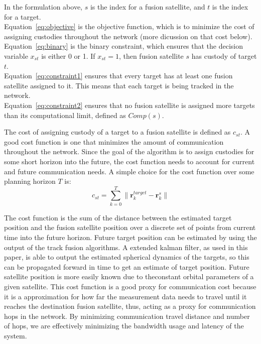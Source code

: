     In the formulation above, $s$ is the index for a fusion satellite, and $t$ is the index for a target. \\
    Equation~\eqref{eq:objective} is the objective function, which is to minimize the cost of assigning custodies throughout the network (more dicussion on that cost below). \\
    Equation~\eqref{eq:binary} is the binary constraint, which ensures that the decision variable $x_{st}$ is either 0 or 1. If $x_{st} = 1$, then fusion satellite $s$ has custody of target $t$. \\
    Equation~\eqref{eq:constraint1} ensures that every target has at least one fusion satellite assigned to it. This means that each target is being tracked in the network. \\
    Equation~\eqref{eq:constraint2} ensures that no fusion satellite is assigned more targets than its computational limit, defined as $Comp(s)$. 

    The cost of assigning custody of a target to a fusion satellite is defined as $c_{st}$. A good cost function is one that minimizes the amount of communication throughout the network. 
    Since the goal of the algorithm is to assign custodies for some short horizon into the future, the cost function needs to account for current and future communication needs. 
    A simple choice for the cost function over some planning horizon $T$ is:
    \begin{equation}
        c_{st} = \sum_{k=0}^{T} \| \mathbf{r}_k^{target} - \mathbf{r}_k^s \|
        \label{eq:cost}
    \end{equation}

    The cost function is the sum of the distance between the estimated target position and the fusion satellite position over a discrete set of points from current time into the future horizon. 
    Future target position can be estimated by using the output of the track fusion algorithms. A extended kalman filter, as used in this paper, is able to output the estimated spherical dynamics of the targets, so this can be propagated forward in time to get an estimate of target position.
    Future satellite position is more easily known due to theconstant orbital parameters of a given satellite.
    This cost function is a good proxy for communication cost because it is a approximation for how far the measurement data needs to travel until it reaches the destination fusion satellite, thus, acting as a proxy for communication hops in the network. 
    By minimizing communication travel distance and number of hops, we are effectively minimizing the bandwidth usage and latency of the system.

